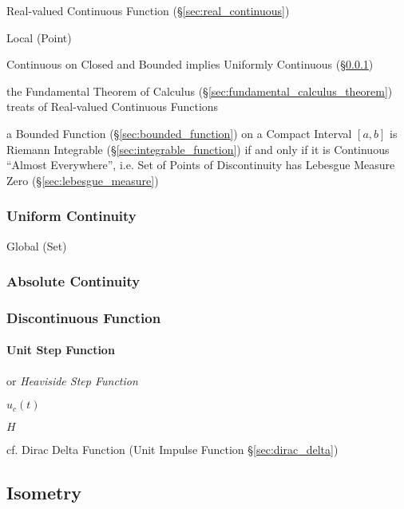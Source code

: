 Real-valued Continuous Function (\S\ref{sec:real_continuous})

Local (Point)

Continuous on Closed and Bounded implies Uniformly Continuous
(\S\ref{sec:uniform_continuity})

the Fundamental Theorem of Calculus (\S\ref{sec:fundamental_calculus_theorem})
treats of Real-valued Continuous Functions

a Bounded Function (\S\ref{sec:bounded_function}) on a Compact Interval $[a,b]$
is Riemann Integrable (\S\ref{sec:integrable_function}) if and only if it is
Continuous ``Almost Everywhere'', i.e. Set of Points of Discontinuity has
Lebesgue Measure Zero (\S\ref{sec:lebesgue_measure})



\subsubsection{Uniform Continuity}\label{sec:uniform_continuity}

Global (Set)



\subsubsection{Absolute Continuity}\label{sec:absolute_contunuity}

\subsubsection{Discontinuous Function}\label{sec:discontinuous_function}

\paragraph{Unit Step Function}\label{sec:unit_step_function}\hfill

or \emph{Heaviside Step Function}

$u_c(t)$

$H$

cf. Dirac Delta Function (Unit Impulse Function \S\ref{sec:dirac_delta})



\subsection{Isometry}\label{sec:isometry}

